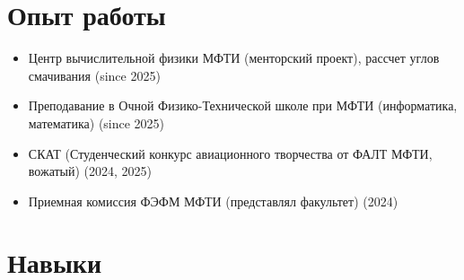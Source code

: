 \documentclass[a4paper, 12pt]{article}
\begin{document}
\section{Опыт работы}
\begin{itemize}
    \item Центр вычислительной физики МФТИ (менторский проект), рассчет углов смачивания (since 2025)
    \item Преподавание в Очной Физико-Технической школе при МФТИ (информатика, математика) (since 2025)
    \item СКАТ (Студенческий конкурс авиационного творчества от ФАЛТ МФТИ, вожатый) (2024, 2025)
    \item Приемная комиссия ФЭФМ МФТИ (представлял факультет) (2024)
\end{itemize}

\section{Навыки}
\end{document}
